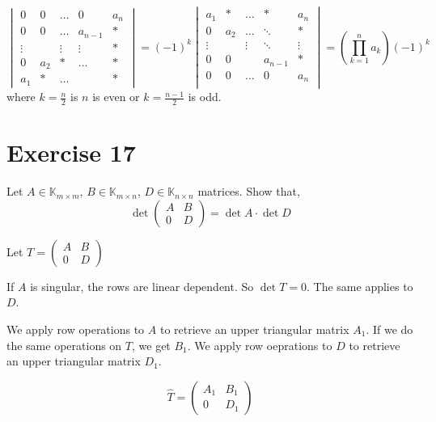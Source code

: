 \documentclass[a4paper]{article}
\theoremstyle{definition}
\begin{document}
\[
  \begin{vmatrix}
    0 & 0 & \ldots & 0 & a_n \\
    0 & 0 & \ldots & a_{n-1} & * \\
    \vdots & & \vdots & \vdots & * \\
    0 & a_2 & * & \ldots & * \\
    a_1 & * & \ldots &  & *
  \end{vmatrix}
  =
  (-1)^k
  \begin{vmatrix}
    a_1 & *   & \ldots & *       & a_n \\
    0   & a_2 & \ldots & \ddots  & * \\
    \vdots    &        & \vdots  & \ddots & \vdots \\
    0   & 0   &        & a_{n-1} & * \\
    0   & 0   & \ldots & 0       & a_n \\
  \end{vmatrix}
  =
  \left(\prod_{k=1}^n a_k\right) (-1)^k
\]
where $k = \frac n2$ is $n$ is even or $k = \frac{n-1}2$ is odd.

\section{Exercise 17}
\begin{ex}
  Let $A \in \mathbb K_{m\times m}$, $B \in \mathbb K_{m\times n}$, $D \in \mathbb K_{n\times n}$ matrices.
  Show that,
  \[
    \det{\begin{pmatrix}
      A & B \\
      0 & D
    \end{pmatrix}}
    = \det{A} \cdot \det{D}
  \]
\end{ex}

Let $T = \begin{pmatrix}
  A & B \\
  0 & D
\end{pmatrix}$

If $A$ is singular, the rows are linear dependent. So $\det{T} = 0$.
The same applies to $D$.

We apply row operations to $A$ to retrieve an upper triangular matrix $A_1$.
If we do the same operations on $T$, we get $B_1$.
We apply row oeprations to $D$ to retrieve an upper triangular matrix $D_1$.

\[
  \hat T = \begin{pmatrix}
    A_1 & B_1 \\
    0 & D_1
  \end{pmatrix}
\]
\end{document}
